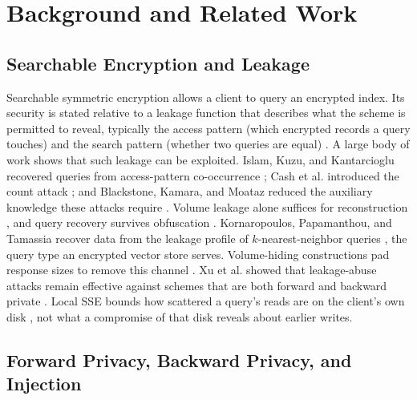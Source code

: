 \section{Background and Related Work}
\label{sec:background}

\subsection{Searchable Encryption and Leakage}

Searchable symmetric encryption allows a client to query an encrypted index. Its security is
stated relative to a leakage function that describes what the scheme is permitted to reveal,
typically the access pattern (which encrypted records a query touches) and the search pattern
(whether two queries are equal) \cite{curtmola2006searchable,kamara2018structured}. A large body
of work shows that such leakage can be exploited. Islam, Kuzu, and Kantarcioglu recovered queries
from access-pattern co-occurrence \cite{islam2012access}; Cash et al. introduced the count attack
\cite{cash2015leakage}; and Blackstone, Kamara, and Moataz reduced the auxiliary knowledge these
attacks require \cite{blackstone2020revisiting}. Volume leakage alone suffices
for reconstruction \cite{kellaris2016generic,grubbs2018pump}, and query recovery survives
obfuscation \cite{oya2022ihop}. Kornaropoulos, Papamanthou, and Tamassia recover
data from the leakage profile of $k$-nearest-neighbor queries \cite{kornaropoulos2019knn}, the
query type an encrypted vector store serves. Volume-hiding constructions pad response sizes to
remove this channel \cite{kamara2019volume,patel2019mitigating}. Xu et al. showed that
leakage-abuse attacks remain effective against schemes that are both forward and backward private
\cite{xu2023leakage}. Local SSE bounds how scattered a query's reads are on the client's own disk
\cite{minaud2022dynamic}, not what a compromise of that disk reveals about earlier writes.

\subsection{Forward Privacy, Backward Privacy, and Injection}

